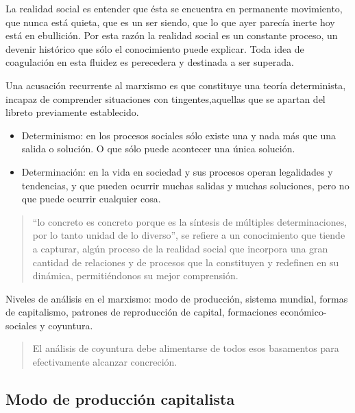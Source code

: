 \documentclass[
  letterpaper,
  DIV=11,
  numbers=noendperiod]{scrreprt}
\begin{document}
La realidad social es entender que ésta se encuentra en permanente
movimiento, que nunca está quieta, que es un ser siendo, que lo que ayer
parecía inerte hoy está en ebullición. Por esta razón la realidad social
es un constante proceso, un devenir histórico que sólo el conocimiento
puede explicar. Toda idea de coagulación en esta fluidez es perecedera y
destinada a ser superada.

Una acusación recurrente al marxismo es que constituye una teoría
determinista, incapaz de comprender situaciones con tingentes,aquellas
que se apartan del libreto previamente establecido.

\begin{itemize}
\item
  Determinismo: en los procesos sociales sólo existe una y nada más que
  una salida o solución. O que sólo puede acontecer una única solución.
\item
  Determinación: en la vida en sociedad y sus procesos operan
  legalidades y tendencias, y que pueden ocurrir muchas salidas y muchas
  soluciones, pero no que puede ocurrir cualquier cosa.
\end{itemize}

\begin{quote}
``lo concreto es concreto porque es la síntesis de múltiples
determinaciones, por lo tanto unidad de lo diverso'', se refiere a un
conocimiento que tiende a capturar, algún proceso de la realidad social
que incorpora una gran cantidad de relaciones y de procesos que la
constituyen y redefinen en su dinámica, permitiéndonos su mejor
comprensión.
\end{quote}

Niveles de análisis en el marxismo: modo de producción, sistema mundial,
formas de capitalismo, patrones de reproducción de capital, formaciones
económico-sociales y coyuntura.

\begin{quote}
El análisis de coyuntura debe alimentarse de todos esos basamentos para
efectivamente alcanzar concreción.
\end{quote}

\subsection{Modo de producción
capitalista}\label{modo-de-producciuxf3n-capitalista}
\end{document}
